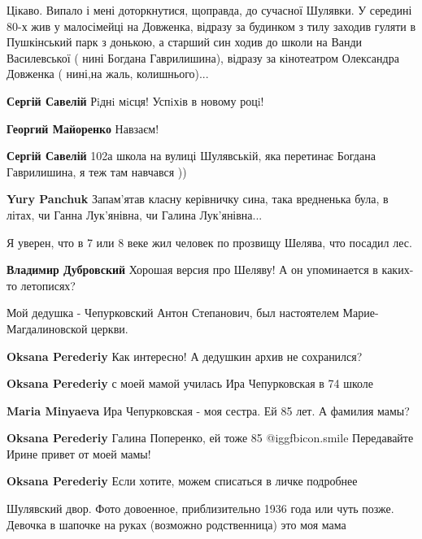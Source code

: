 \begin{itemize}

Цікаво. Випало і мені доторкнутися, щоправда, до сучасної Шулявки. У середині
80-х жив у малосімейці на Довженка, відразу за будинком з тилу заходив гуляти в
Пушкінський парк з донькою, а старший син ходив до школи на Ванди Василевської
( нині Богдана Гаврилишина), відразу за кінотеатром Олександра Довженка (
нині,на жаль, колишнього)...

\begin{itemize} %
\textbf{Сергій Савелій} Рiднi мiсця! Успiхiв в новому роцi!

\textbf{Георгий Майоренко} Навзаєм!

\textbf{Сергій Савелій} 102а школа на вулиці Шулявській, яка перетинає Богдана Гаврилишина, я теж там навчався ))

\textbf{Yury Panchuk} Запам'ятав класну керівничку сина, така вредненька була, в літах, чи Ганна Лук'янівна, чи Галина Лук'янівна...
\end{itemize} %

Я уверен, что в 7 или 8 веке жил человек по прозвищу Шелява, что посадил лес.

\textbf{Владимир Дубровский} Хорошая версия про Шеляву! А он упоминается в каких-то летописях?

Мой дедушка - Чепурковский Антон Степанович, был настоятелем Марие-Магдалиновской церкви.

\begin{itemize} %
\textbf{Oksana Perederiy} Как интересно! А дедушкин архив не сохранился?

\textbf{Oksana Perederiy} с моей мамой училась Ира Чепурковская в 74 школе

\textbf{Maria Minyaeva} Ира Чепурковская - моя сестра. Ей 85 лет. А фамилия мамы?

\textbf{Oksana Perederiy} Галина Поперенко, ей тоже 85  @igg{fbicon.smile}  Передавайте Ирине привет от моей мамы!

\textbf{Oksana Perederiy} Если хотите, можем списаться в личке подробнее
\end{itemize} %


Шулявский двор. Фото довоенное, приблизительно 1936 года или чуть позже.
Девочка в шапочке на руках (возможно родственница) это моя мама


\end{itemize}
